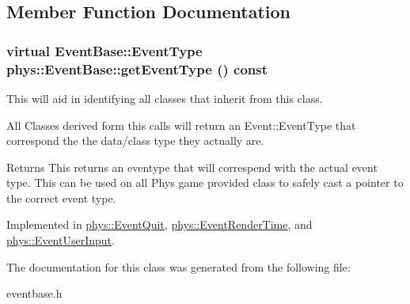\subsection{Member Function Documentation}
\hypertarget{classphys_1_1EventBase_a0f39a25f4b64f7cf701e174454616366}{
\subsubsection[{getEventType}]{\setlength{\rightskip}{0pt plus 5cm}virtual {\bf EventBase::EventType} phys::EventBase::getEventType () const}}
\label{dd/d80/classphys_1_1EventBase_a0f39a25f4b64f7cf701e174454616366}


This will aid in identifying all classes that inherit from this class. 

All Classes derived form this calls will return an Event::EventType that correspond the the data/class type they actually are. \begin{DoxyReturn}{Returns}
This returns an eventype that will correspend with the actual event type. This can be used on all Phys game provided class to safely cast a pointer to the correct event type. 
\end{DoxyReturn}


Implemented in \hyperlink{classphys_1_1EventQuit_ad996640acbb58d2a17fc405de6515c93}{phys::EventQuit}, \hyperlink{classphys_1_1EventRenderTime_a76a47983d5aa197104cc3c0b9dea9dfa}{phys::EventRenderTime}, and \hyperlink{classphys_1_1EventUserInput_ab31bb312cde99c0a2bf64af012ee4b87}{phys::EventUserInput}.



The documentation for this class was generated from the following file:\begin{DoxyCompactItemize}
\item 
eventbase.h\end{DoxyCompactItemize}
